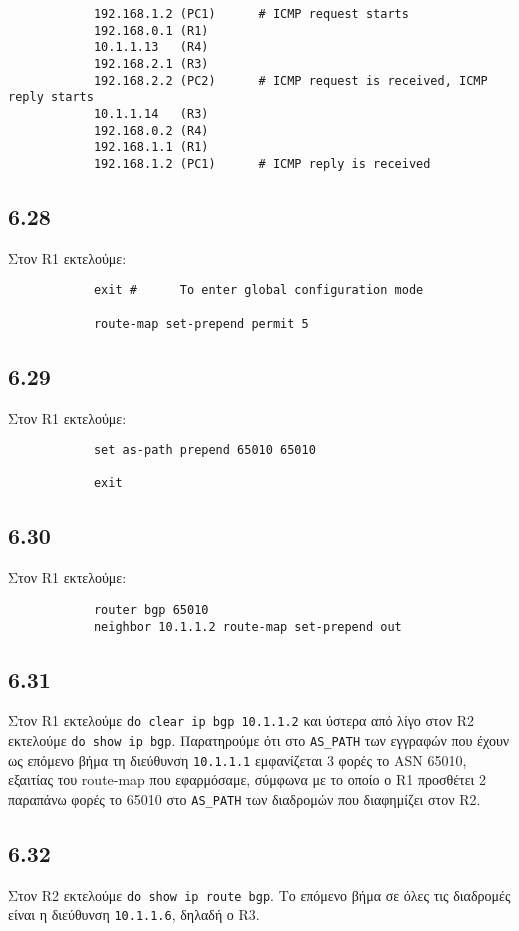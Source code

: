 \documentclass[a4paper, 12pt]{article}
\begin{document}
		\begin{verbatim}
			192.168.1.2 (PC1)      # ICMP request starts
			192.168.0.1 (R1) 
			10.1.1.13   (R4)
			192.168.2.1 (R3)
			192.168.2.2 (PC2)      # ICMP request is received, ICMP reply starts
			10.1.1.14   (R3)
			192.168.0.2 (R4)
			192.168.1.1 (R1)
			192.168.1.2 (PC1)      # ICMP reply is received
		\end{verbatim}

	\subsection*{6.28}
		Στον R1 εκτελούμε:
		
		\begin{verbatim}
			exit #      To enter global configuration mode
			
			route-map set-prepend permit 5
		\end{verbatim}

	\subsection*{6.29}
		Στον R1 εκτελούμε:
		
		\begin{verbatim}
			set as-path prepend 65010 65010
			
			exit
		\end{verbatim}

	\subsection*{6.30}
		Στον R1 εκτελούμε:
		
		\begin{verbatim}
			router bgp 65010
			neighbor 10.1.1.2 route-map set-prepend out
		\end{verbatim}

	\subsection*{6.31}
		Στον R1 εκτελούμε \verb|do clear ip bgp 10.1.1.2| και ύστερα από λίγο στον R2 εκτελούμε \verb|do show ip bgp|. Παρατηρούμε ότι στο \verb|AS_PATH| των εγγραφών που έχουν ως επόμενο βήμα τη διεύθυνση \verb|10.1.1.1| εμφανίζεται 3 φορές το ASN 65010, εξαιτίας του route-map που εφαρμόσαμε, σύμφωνα με το οποίο ο R1 προσθέτει 2 παραπάνω φορές το 65010 στο \verb|AS_PATH| των διαδρομών που διαφημίζει στον R2.
		
	\subsection*{6.32}
		Στον R2 εκτελούμε \verb|do show ip route bgp|. Το επόμενο βήμα σε όλες τις διαδρομές είναι η διεύθυνση \verb|10.1.1.6|, δηλαδή ο R3.
\end{document}
